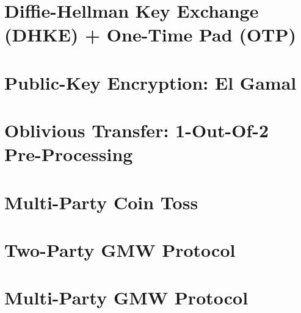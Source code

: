 \documentclass[11pt,hidelinks]{article}
\begin{document}
\section{Diffie-Hellman Key Exchange (DHKE) + One-Time Pad (OTP)}\label{sec:dhke_otp}


\section{Public-Key Encryption: El Gamal}\label{sec:el_gamal}


%

\section{Oblivious Transfer: 1-Out-Of-2 Pre-Processing}\label{sec:ot_pre}


\section{Multi-Party Coin Toss}\label{sec:coin}


\section{Two-Party GMW Protocol}\label{sec:gmw}


\section{Multi-Party GMW Protocol}\label{sec:gmw_n}

\end{document}
